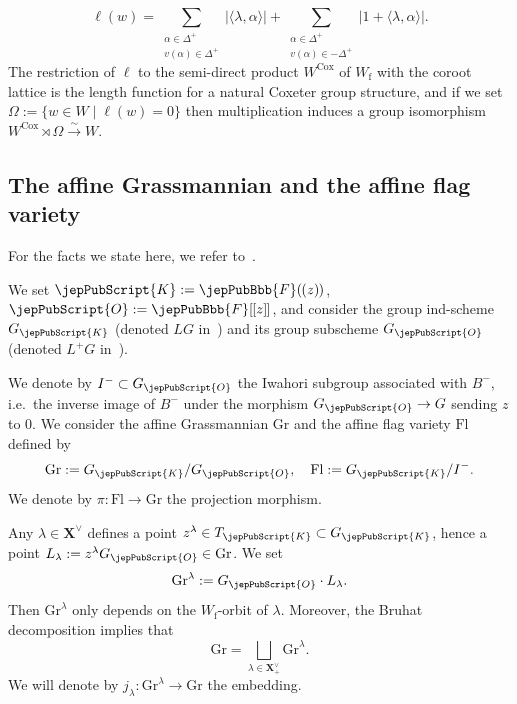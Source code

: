  \[
  \ell(w) = \sum_{\substack{\alpha \in \Delta^+ \\ v(\alpha) \in \Delta^+}} |\langle \lambda, \alpha \rangle| + \sum_{\substack{\alpha \in \Delta^+ \\ v(\alpha) \in -\Delta^+}} |1+\langle \lambda, \alpha \rangle|.
 \]
 The restriction of $\ell$ to the semi-direct product $W^{\mathrm{Cox}}$ of $W_{\mathrm{f}}$ with the coroot lattice is the length function for a natural Coxeter group structure, and if we set $\Omega := \{w \in W \mid \ell(w)=0\}$ then multiplication induces a group isomorphism $W^{\mathrm{Cox}} \rtimes \Omega \xrightarrow{\sim} W$.

\subsection{The affine Grassmannian and the affine flag variety}
\label{jep104local030}

For the facts we state here, we refer to~\cite{jep104ref21}.

We set $\jepPubScript{K}:=\jepPubBbb{F}( \hspace{-0.5pt} (z) \hspace{-0.5pt} )$, $\jepPubScript{O} := \jepPubBbb{F}[ \hspace{-0.5pt} [z] \hspace{-0.5pt} ]$, and consider the group ind-scheme $G_{\jepPubScript{K}}$ (denoted $LG$ in~\cite{jep104ref21}) and its group subscheme $G_{\jepPubScript{O}}$ (denoted $L^+ G$ in~\cite{jep104ref21}).

We denote by $I^- \subset G_{\jepPubScript{O}}$ the Iwahori subgroup associated with $B^-$, i.e.~the inverse image of $B^-$ under the morphism $G_{\jepPubScript{O}} \to G$ sending $z$ to $0$. We consider the affine Grassmannian $\mathrm{Gr}$ and the affine flag variety $\mathrm{Fl}$ defined by
\[
\mathrm{Gr} := G_{\jepPubScript{K}}/G_{\jepPubScript{O}}, \quad \mathrm{Fl} := G_{\jepPubScript{K}} / I^-.
\]
We denote by $\pi : \mathrm{Fl} \to \mathrm{Gr}$ the projection morphism.

Any $\lambda \in \boldsymbol{X}^\vee$ defines a point $z^\lambda \in T_{\jepPubScript{K}} \subset G_{\jepPubScript{K}}$, hence a point $L_\lambda := z^{\lambda} G_{\jepPubScript{O}} \in \mathrm{Gr}$. We set
\[
\mathrm{Gr}^\lambda := G_{\jepPubScript{O}} \cdot L_\lambda.
\]
Then $\mathrm{Gr}^\lambda$ only depends on the $W_{\mathrm{f}}$-orbit of $\lambda$. Moreover,
the Bruhat decomposition implies that
\[
\mathrm{Gr} = 
\mathop{\textstyle\bigsqcup}\limits_{\lambda \in \boldsymbol{X}^\vee_+} \mathrm{Gr}^\lambda.
\]
We will denote by $j_\lambda : \mathrm{Gr}^\lambda \to \mathrm{Gr}$ the embedding.


